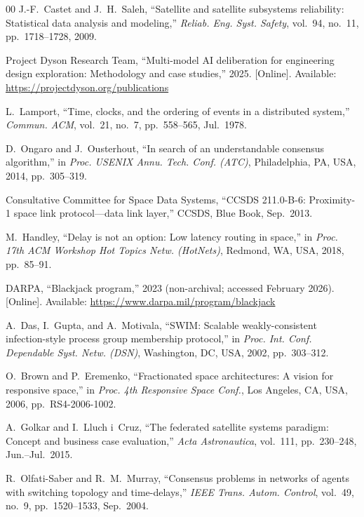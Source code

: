 \documentclass[journal]{IEEEtran}
\begin{document}
\begin{thebibliography}{00}
J.-F.~Castet and J.~H.~Saleh, ``Satellite and satellite subsystems reliability: Statistical data analysis and modeling,'' \emph{Reliab. Eng. Syst. Safety}, vol.~94, no.~11, pp.~1718--1728, 2009.


Project Dyson Research Team, ``Multi-model AI deliberation for engineering design exploration: Methodology and case studies,'' 2025. [Online]. Available: \url{https://projectdyson.org/publications}

L.~Lamport, ``Time, clocks, and the ordering of events in a distributed system,'' \emph{Commun. ACM}, vol.~21, no.~7, pp.~558--565, Jul.~1978.

D.~Ongaro and J.~Ousterhout, ``In search of an understandable consensus algorithm,'' in \emph{Proc. USENIX Annu. Tech. Conf. (ATC)}, Philadelphia, PA, USA, 2014, pp.~305--319.

Consultative Committee for Space Data Systems, ``CCSDS 211.0-B-6: Proximity-1 space link protocol---data link layer,'' CCSDS, Blue Book, Sep.~2013.

M.~Handley, ``Delay is not an option: Low latency routing in space,'' in \emph{Proc. 17th ACM Workshop Hot Topics Netw. (HotNets)}, Redmond, WA, USA, 2018, pp.~85--91.

DARPA, ``Blackjack program,'' 2023 (non-archival; accessed February 2026). [Online]. Available: \url{https://www.darpa.mil/program/blackjack}

A.~Das, I.~Gupta, and A.~Motivala, ``SWIM: Scalable weakly-consistent infection-style process group membership protocol,'' in \emph{Proc. Int. Conf. Dependable Syst. Netw. (DSN)}, Washington, DC, USA, 2002, pp.~303--312.

O.~Brown and P.~Eremenko, ``Fractionated space architectures: A vision for responsive space,'' in \emph{Proc. 4th Responsive Space Conf.}, Los Angeles, CA, USA, 2006, pp.~RS4-2006-1002.

A.~Golkar and I.~Lluch i~Cruz, ``The federated satellite systems paradigm: Concept and business case evaluation,'' \emph{Acta Astronautica}, vol.~111, pp.~230--248, Jun.--Jul.~2015.

R.~Olfati-Saber and R.~M.~Murray, ``Consensus problems in networks of agents with switching topology and time-delays,'' \emph{IEEE Trans. Autom. Control}, vol.~49, no.~9, pp.~1520--1533, Sep.~2004.


\end{thebibliography}
\end{document}
